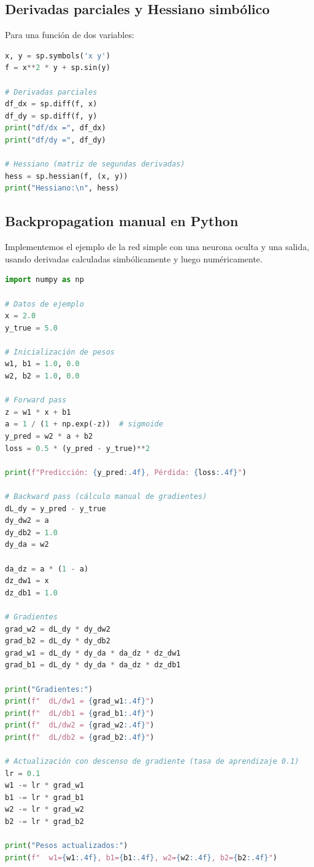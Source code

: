 \documentclass[12pt,a4paper,openany,oneside]{book}
\begin{document}
\subsection{Derivadas parciales y Hessiano simbólico}
Para una función de dos variables:
\begin{lstlisting}[language=Python]
x, y = sp.symbols('x y')
f = x**2 * y + sp.sin(y)

# Derivadas parciales
df_dx = sp.diff(f, x)
df_dy = sp.diff(f, y)
print("df/dx =", df_dx)
print("df/dy =", df_dy)

# Hessiano (matriz de segundas derivadas)
hess = sp.hessian(f, (x, y))
print("Hessiano:\n", hess)
\end{lstlisting}

\subsection{Backpropagation manual en Python}
Implementemos el ejemplo de la red simple con una neurona oculta y una salida, usando derivadas calculadas simbólicamente y luego numéricamente.

\begin{lstlisting}[language=Python]
import numpy as np

# Datos de ejemplo
x = 2.0
y_true = 5.0

# Inicialización de pesos
w1, b1 = 1.0, 0.0
w2, b2 = 1.0, 0.0

# Forward pass
z = w1 * x + b1
a = 1 / (1 + np.exp(-z))  # sigmoide
y_pred = w2 * a + b2
loss = 0.5 * (y_pred - y_true)**2

print(f"Predicción: {y_pred:.4f}, Pérdida: {loss:.4f}")

# Backward pass (cálculo manual de gradientes)
dL_dy = y_pred - y_true
dy_dw2 = a
dy_db2 = 1.0
dy_da = w2

da_dz = a * (1 - a)
dz_dw1 = x
dz_db1 = 1.0

# Gradientes
grad_w2 = dL_dy * dy_dw2
grad_b2 = dL_dy * dy_db2
grad_w1 = dL_dy * dy_da * da_dz * dz_dw1
grad_b1 = dL_dy * dy_da * da_dz * dz_db1

print("Gradientes:")
print(f"  dL/dw1 = {grad_w1:.4f}")
print(f"  dL/db1 = {grad_b1:.4f}")
print(f"  dL/dw2 = {grad_w2:.4f}")
print(f"  dL/db2 = {grad_b2:.4f}")

# Actualización con descenso de gradiente (tasa de aprendizaje 0.1)
lr = 0.1
w1 -= lr * grad_w1
b1 -= lr * grad_b1
w2 -= lr * grad_w2
b2 -= lr * grad_b2

print("Pesos actualizados:")
print(f"  w1={w1:.4f}, b1={b1:.4f}, w2={w2:.4f}, b2={b2:.4f}")
\end{lstlisting}
\end{document}
